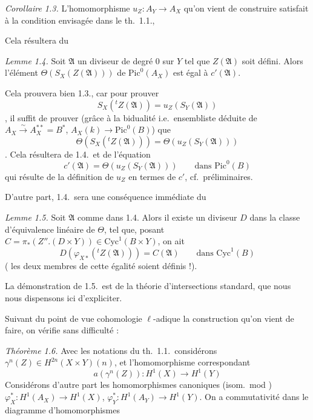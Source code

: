 \documentclass[11pt,a4paper]{article}
\begin{document}
\emph{Corollaire 1.3.} L'homomorphisme $u_Z : A_Y \to A_X$ qu'on vient de construire satisfait à la condition envisagée dans le th.\ 1.1., 

Cela résultera du

\emph{Lemme 1.4.} Soit $\mathfrak{A}$ un diviseur de degré $0$ sur $Y$ tel que \struck{\ill{}} $Z(\mathfrak{A})$ soit défini. Alors l'élément $\Theta(S_X(Z(\mathfrak{A})))$ de $\mathrm{Pic}^{0}(A_X)$ est égal à $c'(\mathfrak{A})$.

 Cela prouvera bien 1.3., car pour prouver
\[
  S_X({}^{t}Z(\mathfrak{A})) = u_Z(S_Y(\mathfrak{A}))
\]
, il suffit de prouver (grâce à la bidualité  i.e.\ ensembliste  déduite de $A_X \xrightarrow{\sim} A_X^{**} = B^{*}$, \struck{\ill{}} $A_X(k) \to \mathrm{Pic}^{0}(B)$) que
\[
  \Theta(S_X({}^{t}Z(\mathfrak{A}))) = \Theta(u_Z(S_Y(\mathfrak{A})))
\]
 \struck{\ill{}}. Cela résultera de 1.4.\ et de l'équation
\[
  c'(\mathfrak{A}) = \Theta(u_Z(S_Y(\mathfrak{A}))) \qquad \text{dans } \mathrm{Pic}^{0}(B)
\]
qui résulte de la définition de $u_Z$ en termes de $c'$, cf.\ préliminaires.

D'autre part, 1.4.\ sera une conséquence immédiate du

\emph{Lemme 1.5.} Soit $\mathfrak{A}$ comme dans 1.4. Alors il existe un diviseur $D$ dans la classe d'équivalence linéaire de $\Theta$, tel que, \struck{\ill{}} posant $C = \pi_{*}(Z'' . (D \times Y)) \in \mathrm{Cyc}^{1}(B \times Y)$, \struck{\ill{}} on ait
\[
  D(\varphi_{X*}({}^{t}Z(\mathfrak{A}))) = C(\mathfrak{A}) \qquad \text{dans } \mathrm{Cyc}^{1}(B)
\]
( les deux membres de cette égalité soient définis !).

La démonstration de 1.5.\ est de la théorie d'intersections standard, que nous nous dispensons ici d'expliciter.

Suivant du point de vue cohomologie $\ell$-adique la construction qu'on vient de faire, on vérifie sans difficulté :

\emph{Théorème 1.6.} Avec les notations du th.\ 1.1.\ considérons $\gamma^{n}(Z) \in H^{2n}(X \times Y)(n)$, et l'homomorphisme correspondant
\[
  a(\gamma^{n}(Z)) : H^{1}(X) \longrightarrow H^{1}(Y)
\]
 Considérons d'autre part  les homomorphismes canoniques (isom.\ mod   \ill{} \ill{})
$\varphi_X^{*} : H^{1}(A_X) \to H^{1}(X)$, $\varphi_Y^{*} : H^{1}(A_Y) \to H^{1}(Y)$. On a commutativité dans le diagramme d'homomorphismes
\end{document}
